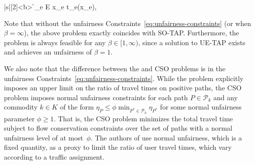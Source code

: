 \documentclass{article}
\newif\ifarxiv   %
\begin{document}
\begin{definition}
\begin{mini!}|s|[2]<b>
	{\f }{\sum_{e \in E} x_e t_e(x_e), \label{eq:efficient-Obj}}
	{\label{eq:Example3}}
	{}
	\addConstraint{~\eqref{eq:edge-constraint}}{-\eqref{eq:nonnegativity-constraints},}
\end{mini!}
\end{definition}
\begin{comment}
\begin{definition}[Program for $\beta$-Fair System Optimum]
\begin{mini!}|s|[2]<b>
	{\f \in \Omega}{\sum_{e \in E} x_e t_e(x_e), \label{eq:efficient-Obj}}
	{\label{eq:Example3}}
	{}
	\addConstraint{U(\mathbf{x})}{ \leq \beta \label{eq:unfairness-constraints}.}
\end{mini!}
\end{definition}
\end{comment}


Note that without the unfairness Constraints~\eqref{eq:unfairness-constraints} (or when $\beta=\infty$), the above problem exactly coincides with SO-TAP. Furthermore, the \fso problem is always feasible for any $\beta \in [1, \infty)$, since a solution to UE-TAP exists and achieves an unfairness of $\beta = 1$.

We also note that the difference between the \fso and CSO problems is in the unfairness Constraints~\eqref{eq:unfairness-constraints}. While the \fso problem explicitly imposes an upper limit on the ratio of travel times on positive paths, the CSO problem imposes normal unfairness constraints for each path $P \in \mathcal{P}_k$ and any commodity $k \in K$ of the form $\eta_P \leq \phi \min_{P^* \in \mathcal{P}_k} \eta_{P^*}$ for some normal unfairness parameter $\phi\geq 1$. That is, the CSO problem minimizes the total travel time subject to flow conservation constraints over the set of paths with a normal unfairness level of at most~$\phi$. \ifarxiv The authors of \cite{so-routing-seminal} use normal unfairness, which is a fixed quantity, as a proxy to limit the maximum possible ratio of user travel times. Note that the experienced user travel times accounts for costs that vary according to a traffic assignment unlike normal unfairness. \else The authors of \cite{so-routing-seminal} use normal unfairness, which is a fixed quantity, as a proxy to limit the ratio of user travel times, which vary according to a traffic assignment. \fi
\end{document}

